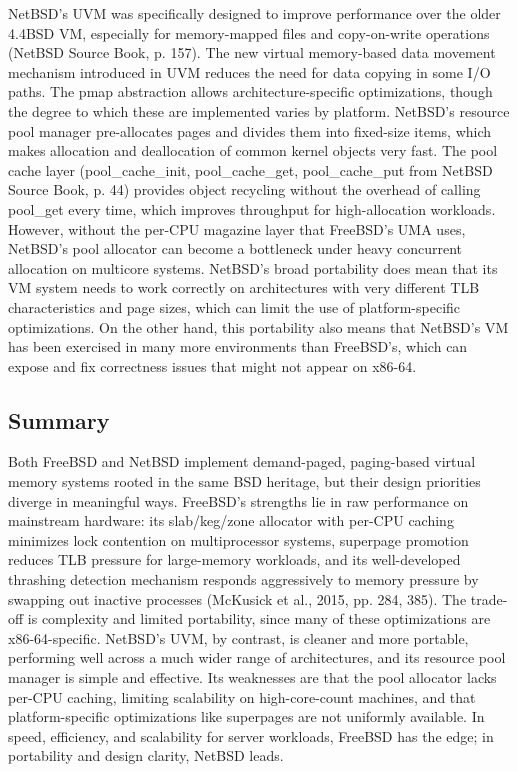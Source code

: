 NetBSD's UVM was specifically designed to improve performance over the older 4.4BSD VM, especially for memory-mapped files and copy-on-write operations (NetBSD Source Book, p. 157). The new virtual memory-based data movement mechanism introduced in UVM reduces the need for data copying in some I/O paths. The pmap abstraction allows architecture-specific optimizations, though the degree to which these are implemented varies by platform.
NetBSD's resource pool manager pre-allocates pages and divides them into fixed-size items, which makes allocation and deallocation of common kernel objects very fast. The pool cache layer (pool\_cache\_init, pool\_cache\_get, pool\_cache\_put from NetBSD Source Book, p. 44) provides object recycling without the overhead of calling pool\_get every time, which improves throughput for high-allocation workloads. However, without the per-CPU magazine layer that FreeBSD's UMA uses, NetBSD's pool allocator can become a bottleneck under heavy concurrent allocation on multicore systems.
NetBSD's broad portability does mean that its VM system needs to work correctly on architectures with very different TLB characteristics and page sizes, which can limit the use of platform-specific optimizations. On the other hand, this portability also means that NetBSD's VM has been exercised in many more environments than FreeBSD's, which can expose and fix correctness issues that might not appear on x86-64.

\subsection{Summary}

Both FreeBSD and NetBSD implement demand-paged, paging-based virtual memory systems rooted in the same BSD heritage, but their design priorities diverge in meaningful ways. FreeBSD's strengths lie in raw performance on mainstream hardware: its slab/keg/zone allocator with per-CPU caching minimizes lock contention on multiprocessor systems, superpage promotion reduces TLB pressure for large-memory workloads, and its well-developed thrashing detection mechanism responds aggressively to memory pressure by swapping out inactive processes (McKusick et al., 2015, pp. 284, 385). The trade-off is complexity and limited portability, since many of these optimizations are x86-64-specific. NetBSD's UVM, by contrast, is cleaner and more portable, performing well across a much wider range of architectures, and its resource pool manager is simple and effective. Its weaknesses are that the pool allocator lacks per-CPU caching, limiting scalability on high-core-count machines, and that platform-specific optimizations like superpages are not uniformly available. In speed, efficiency, and scalability for server workloads, FreeBSD has the edge; in portability and design clarity, NetBSD leads.

